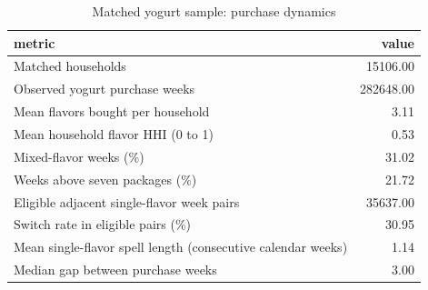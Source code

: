 \begin{table}
\caption{Matched yogurt sample: purchase dynamics}
\begin{tabular}{lr}
\toprule
metric & value \\
\midrule
Matched households & 15106.00 \\
Observed yogurt purchase weeks & 282648.00 \\
Mean flavors bought per household & 3.11 \\
Mean household flavor HHI (0 to 1) & 0.53 \\
Mixed-flavor weeks (\%) & 31.02 \\
Weeks above seven packages (\%) & 21.72 \\
Eligible adjacent single-flavor week pairs & 35637.00 \\
Switch rate in eligible pairs (\%) & 30.95 \\
Mean single-flavor spell length (consecutive calendar weeks) & 1.14 \\
Median gap between purchase weeks & 3.00 \\
\bottomrule
\end{tabular}
\end{table}
